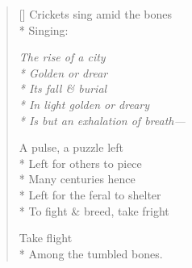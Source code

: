 \label{ch:august_evening}
\begin{verse}[\versewidth]
Crickets sing amid the bones\\*
Singing:

 \textit{The rise of a city\\*
Golden or drear\\*
Its fall \& burial\\*
In light golden or dreary\\*
Is but an exhalation of breath---}

A pulse, a puzzle   left\\*
Left for others to piece\\*
Many centuries hence\\*
Left for the feral to shelter\\*
To fight \& breed, take fright 

\hspace{4\vgap} Take flight\\*
Among the tumbled bones.
\end{verse}
